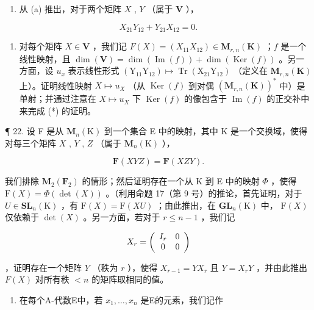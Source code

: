 \begin{enumerate}
\def\labelenumi{(\alph{enumi})}
\setcounter{enumi}{1}
\tightlist
\item
  从 (a) 推出，对于两个矩阵 \(X\) , \(Y\) （属于 \(\mathbf{V}\) ），
\end{enumerate}

\[
X _ {2 1} Y _ {1 2} + Y _ {2 1} X _ {1 2} = 0.
\]

\begin{enumerate}
\def\labelenumi{(\alph{enumi})}
\setcounter{enumi}{2}
\tightlist
\item
  对每个矩阵 \(X \in \mathbf{V}\) ，我们记 \(F(X) = (X_{11}X_{12}) \in \mathbf{M}_{r,n}(\mathbf{K})\) ；\(f\) 是一个线性映射，且 \(\dim(\mathbf{V}) = \dim(\operatorname{Im}(f)) + \dim(\operatorname{Ker}(f))\) 。另一方面，设 \(u_x\) 表示线性形式 \((\mathrm{Y}_{11}\mathrm{Y}_{12}) \mapsto \operatorname{Tr}(\mathrm{X}_{21}\mathrm{Y}_{12})\) （定义在 \(\mathbf{M}_{r,n}(\mathbf{K})\) 上）。证明线性映射 \(X \mapsto u_X\) （从 \(\operatorname{Ker}(f)\) 到对偶 \((\mathbf{M}_{r,n}(\mathbf{K}))^*\) 中）是单射；并通过注意在 \(X \mapsto u_X\) 下 \(\operatorname{Ker}(f)\) 的像包含于 \(\operatorname{Im}(f)\) 的正交补中来完成 (*) 的证明。
\end{enumerate}

¶ 22. 设 F 是从 \(\mathbf{M}_{n}(\mathrm{K})\) 到一个集合 E 中的映射，其中 K 是一个交换域，使得对每三个矩阵 \(X\) , \(Y\) , \(Z\) （属于 \(\mathbf{M}_{n}(\mathrm{K})\) ），

\[
\mathbf {F} (X Y Z) = \mathbf {F} (X Z Y).
\]

我们排除 \(\mathbf{M}_{2}(\mathbf{F}_{2})\) 的情形；然后证明存在一个从 K 到 E 中的映射 \(\Phi\) ，使得 \(\mathrm{F}(X)=\Phi(\det(X))\) 。（利用命题 17（第 9 号）的推论，首先证明，对于 \(U\in\mathbf{SL}_{n}(\mathrm{K})\) ，有 \(\mathrm{F}(X)=\mathrm{F}(XU)\) ；由此推出，在 \(\mathbf{GL}_{n}(\mathrm{K})\) 中， \(\mathrm{F}(X)\) 仅依赖于 \(\det(X)\) 。另一方面，若对于 \(r\leqslant n-1\) ，我们记

\[
X _ {r} = \left( \begin{array}{c c} I _ {r} & 0 \\ 0 & 0 \end{array} \right)
\]

，证明存在一个矩阵 \(Y\) （秩为 \(r\) ），使得 \(X_{r-1} = YX_r\) 且 \(Y = X_rY\) ，并由此推出 \(F(X)\) 对所有秩 \(< n\) 的矩阵取相同的值。

\begin{enumerate}
\def\labelenumi{\arabic{enumi}.}
\setcounter{enumi}{22}
\tightlist
\item
  在每个A-代数E中，若 \(x_{1}, \ldots, x_{n}\) 是E的元素，我们记作
\end{enumerate}

